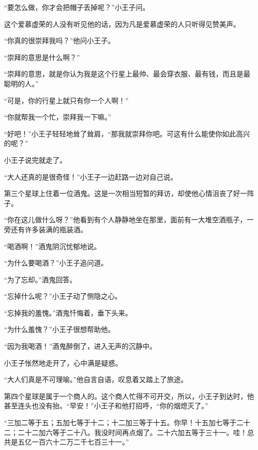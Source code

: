 “要怎么做，你才会把帽子丢掉呢？”小王子问。

这个爱慕虚荣的人没有听见他的话，因为凡是爱慕虚荣的人只听得见赞美声。

“你真的很崇拜我吗？”他问小王子。

“崇拜的意思是什么啊？”

“崇拜的意思，就是你认为我是这个行星上最帅、最会穿衣服、最有钱，而且是最聪明的人。”

“可是，你的行星上就只有你一个人啊！”

“你就帮我一个忙，崇拜我一下嘛。”

“好吧！”小王子轻轻地耸了耸肩，“那我就崇拜你吧。可这有什么能使你如此高兴的呢？”

小王子说完就走了。

“大人还真的是很奇怪！”小王子一边赶路一边对自己说。


\stoptitle

\starttitle[title={12}]

第三个星球上住着一位酒鬼。这是一次相当短暂的拜访，却使他心情沮丧了好一阵子。

“你在这儿做什么呀？”他看到有个人静静地坐在那里，面前有一大堆空酒瓶子，一旁还有许多装满的瓶装酒。

“喝酒啊！”酒鬼阴沉忧郁地说。

“为什么要喝酒？”小王子追问道。

“为了忘却。”酒鬼回答。

“忘掉什么呢？”小王子动了恻隐之心。

“忘掉我的羞愧。”酒鬼忏悔着，垂下头来。

“为什么羞愧？”小王子很想帮助他。

{\startalignment[center]
 \stopalignment}

“因为我喝酒！”酒鬼醉倒了，进入无声的沉静中。

小王子怅然地走开了，心中满是疑惑。

“大人们真是不可理喻。”他自言自语，叹息着又踏上了旅途。


\stoptitle

\starttitle[title={13}]

第四个星球是属于一个商人的。这个商人忙得不可开交，所以，小王子到达时，他甚至连头也没有抬。“早安！”小王子和他打招呼，“你的烟熄灭了。”

“三加二等于五；五加七等于十二；十二加三等于十五。你早！十五加七等于二十二；二十二加六等于二十八。我没时间再点烟了。二十六加五等于三十一。哇！总共是五亿一百六十二万二千七百三十一。”

